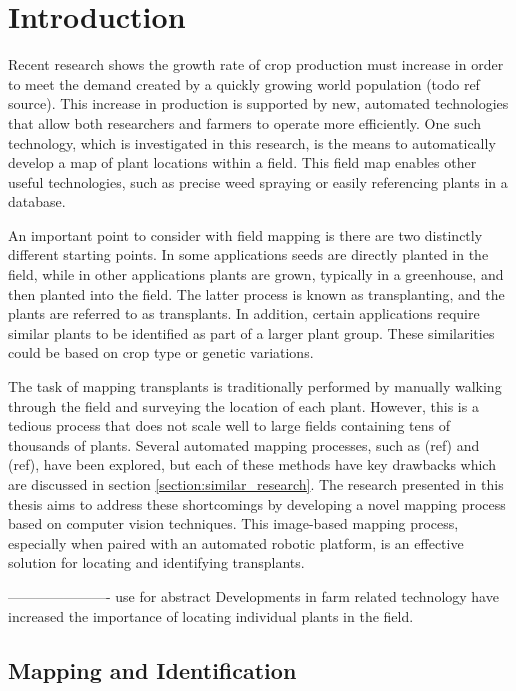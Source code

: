 
\cleardoublepage

\chapter{Introduction}
\label{introduction}

Recent research shows the growth rate of crop production must increase in order to meet the demand created by a quickly growing world population (todo ref source).  This increase in production is supported by new, automated technologies that allow both researchers and farmers to operate more efficiently.  One such technology, which is investigated in this research, is the means to automatically develop a map of plant locations within a field.  This field map enables other useful technologies, such as precise weed spraying or easily referencing plants in a database. 
 
An important point to consider with field mapping is there are two distinctly different starting points.  In some applications seeds are directly planted in the field, while in other applications plants are grown, typically in a greenhouse, and then planted into the field.  The latter process is known as transplanting, and the plants are referred to as transplants.  In addition, certain applications require similar plants to be identified as part of a larger plant group.  These similarities could be based on crop type or genetic variations. 

The task of mapping transplants is traditionally performed by manually walking through the field and surveying the location of each plant. However, this is a tedious process that does not scale well to large fields containing tens of thousands of plants.  Several automated mapping processes, such as (ref) and (ref), have been explored, but each of these methods have key drawbacks which are discussed in section \ref{section:similar_research}.  The research presented in this thesis aims to address these shortcomings by developing a novel mapping process based on computer vision techniques.  This image-based mapping process, especially when paired with an automated robotic platform, is an effective solution for locating and identifying transplants. 

----------------------
use for abstract
 Developments in farm related technology have increased the importance of locating individual plants in the field.

\section{Mapping and Identification}

